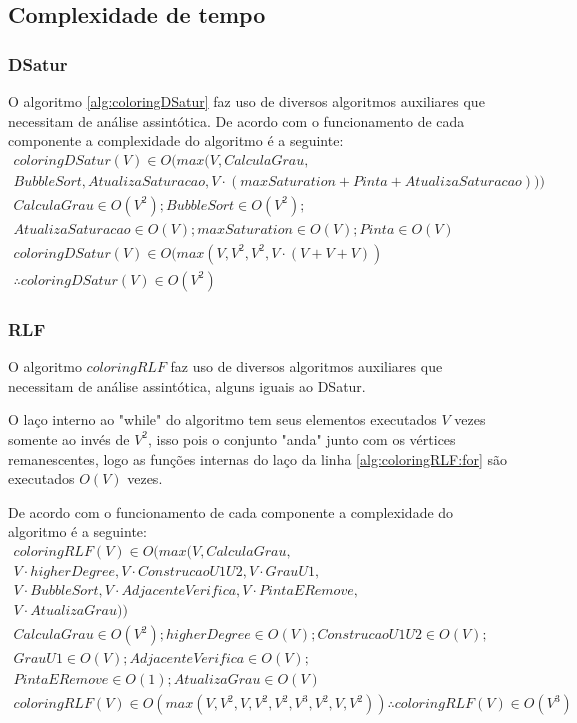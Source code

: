 \documentclass[12pt]{article}
\begin{document}
\subsection{Complexidade de tempo}
\label{sec:orga293be3}
\subsubsection{DSatur}
\label{sec:org578da6b}
O algoritmo \ref{alg:coloringDSatur} faz uso de diversos algoritmos auxiliares que necessitam de análise assintótica. De acordo com o funcionamento de cada componente a complexidade do algoritmo é a seguinte:
\begin{equation}
\begin{aligned}
coloringDSatur(V)\in O(max(V,CalculaGrau,\\BubbleSort,AtualizaSaturacao,V\cdot (maxSaturation + Pinta + AtualizaSaturacao)))\\
CalculaGrau \in O(V^2); BubbleSort \in O(V^2);\\AtualizaSaturacao \in O(V);maxSaturation \in O(V);Pinta \in O(V)\\
coloringDSatur(V)\in O(max(V,V^2,V^2,V\cdot (V + V + V)) \\\therefore coloringDSatur(V)\in O(V^2)
\end{aligned}
\end{equation}


\subsubsection{RLF}
\label{sec:org1e25c8b}
O algoritmo \(coloringRLF\) faz uso de diversos algoritmos auxiliares que necessitam de análise assintótica, alguns iguais ao DSatur.

O laço interno ao "while" do algoritmo tem seus elementos executados \(V\) vezes somente ao invés de \(V^2\), isso pois o conjunto "anda" junto com os vértices remanescentes, logo as funções internas do laço da linha \ref{alg:coloringRLF:for} são executados \(O(V)\) vezes.

De acordo com o funcionamento de cada componente a complexidade do algoritmo é a seguinte:
\begin{equation}
\begin{aligned}
coloringRLF(V)\in O(max(V,CalculaGrau,\\
V\cdot higherDegree,V\cdot ConstrucaoU1U2,V\cdot GrauU1,\\
V\cdot BubbleSort,V\cdot AdjacenteVerifica,V\cdot PintaERemove,\\
V\cdot AtualizaGrau))\\
CalculaGrau \in O(V^2); higherDegree \in O(V);ConstrucaoU1U2 \in O(V);\\GrauU1 \in O(V);AdjacenteVerifica \in O(V);\\ PintaERemove \in O(1);AtualizaGrau \in O(V)\\
coloringRLF(V)\in O(max(V,V^2,V,V^2,V^2,V^3,V^2,V,V^2)) \therefore coloringRLF(V)\in O(V^3)
\end{aligned}
\end{equation}
\end{document}
